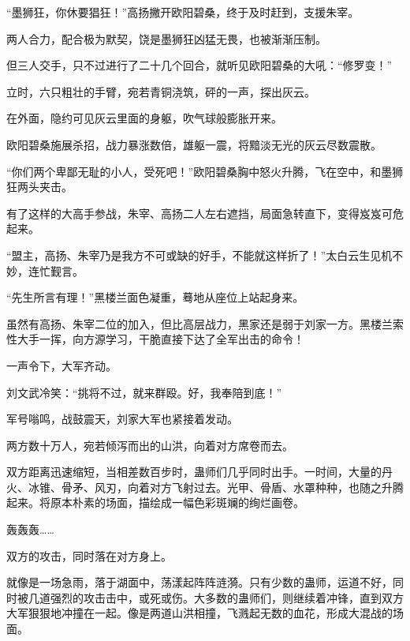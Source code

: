 \begin{this_body}
“墨狮狂，你休要猖狂！”高扬撇开欧阳碧桑，终于及时赶到，支援朱宰。

两人合力，配合极为默契，饶是墨狮狂凶猛无畏，也被渐渐压制。

但三人交手，只不过进行了二十几个回合，就听见欧阳碧桑的大吼：“修罗变！”

立时，六只粗壮的手臂，宛若青铜浇筑，砰的一声，探出灰云。

在外面，隐约可见灰云里面的身躯，吹气球般膨胀开来。

欧阳碧桑施展杀招，战力暴涨数倍，雄躯一震，将黯淡无光的灰云尽数震散。

“你们两个卑鄙无耻的小人，受死吧！”欧阳碧桑胸中怒火升腾，飞在空中，和墨狮狂两头夹击。

有了这样的大高手参战，朱宰、高扬二人左右遮挡，局面急转直下，变得岌岌可危起来。

“盟主，高扬、朱宰乃是我方不可或缺的好手，不能就这样折了！”太白云生见机不妙，连忙觐言。

“先生所言有理！”黑楼兰面色凝重，蓦地从座位上站起身来。

虽然有高扬、朱宰二位的加入，但比高层战力，黑家还是弱于刘家一方。黑楼兰索性大手一挥，向方源学习，干脆直接下达了全军出击的命令！

一声令下，大军齐动。

刘文武冷笑：“挑将不过，就来群殴。好，我奉陪到底！”

军号嗡鸣，战鼓震天，刘家大军也紧接着发动。

两方数十万人，宛若倾泻而出的山洪，向着对方席卷而去。

双方距离迅速缩短，当相差数百步时，蛊师们几乎同时出手。一时间，大量的丹火、冰锥、骨矛、风刃，向着对方飞射过去。光甲、骨盾、水罩种种，也随之升腾起来。将原本朴素的场面，描绘成一幅色彩斑斓的绚烂画卷。

轰轰轰……

双方的攻击，同时落在对方身上。

就像是一场急雨，落于湖面中，荡漾起阵阵涟漪。只有少数的蛊师，运道不好，同时被几道强烈的攻击击中，或死或伤。大多数的蛊师们，则继续着冲锋，直到双方大军狠狠地冲撞在一起。像是两道山洪相撞，飞溅起无数的血花，形成大混战的场面。

\end{this_body}

